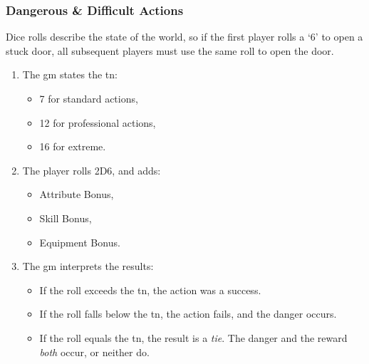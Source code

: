\subsubsection{Dangerous \& Difficult Actions}

Dice rolls describe the state of the world, so if the first player rolls a `6' to open a stuck door, all subsequent players must use the same roll to open the door.

\begin{enumerate}
  \item
  The \gls{gm} states the \gls{tn}:

  \begin{itemize}
    \item
    7 for standard actions,
    \item
    12 for professional actions,
    \item
    16 for extreme.
  \end{itemize}
  \item
  The player rolls 2D6, and adds:
  \begin{itemize}
    \item
    Attribute Bonus,
    \item
    Skill Bonus,
    \item
    Equipment Bonus.
  \end{itemize}
  \item
  The \gls{gm} interprets the results:
  \begin{itemize}
    \item
    If the roll exceeds the \gls{tn}, the action was a success.
    \item
    If the roll falls below the \gls{tn}, the action fails, and the danger occurs.
    \item
    If the roll equals the \gls{tn}, the result is a \emph{tie}.
    The danger and the reward \emph{both} occur, or neither do.
    \end{itemize}
\end{enumerate}
